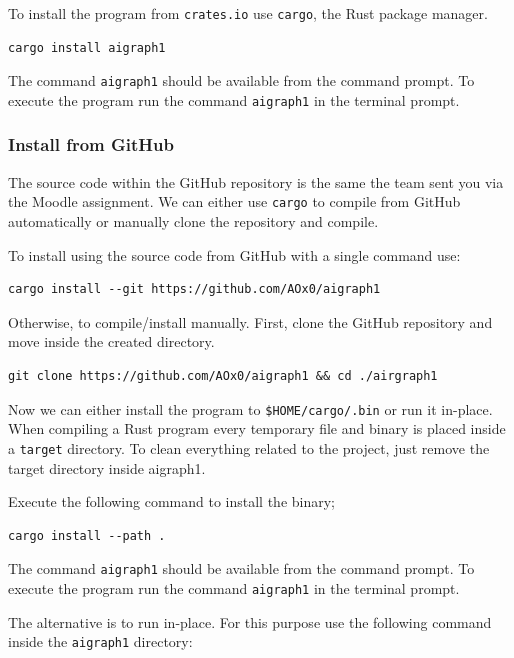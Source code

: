 To install the program from \texttt{crates.io} use \texttt{cargo}, the Rust package manager.

\begin{verbatim}
cargo install aigraph1
\end{verbatim}

The command \texttt{aigraph1} should be available from the command prompt.
To execute the program run the command \texttt{aigraph1} in the terminal prompt.

\subsubsection{Install from GitHub}

The source code within the GitHub repository is the same the team sent you via the Moodle assignment.
We can either use \texttt{cargo} to compile from GitHub automatically or manually clone the repository and
compile.

To install using the source code from GitHub with a single command use:
\begin{verbatim}
cargo install --git https://github.com/AOx0/aigraph1
\end{verbatim}

Otherwise, to compile/install manually. First, clone the GitHub repository and move inside the created directory.

\begin{verbatim}
git clone https://github.com/AOx0/aigraph1 && cd ./airgraph1
\end{verbatim}

Now we can either install the program to \texttt{\$HOME/cargo/.bin} or run it in-place. When compiling a 
Rust program every temporary file and binary is placed inside a \texttt{target} directory. To clean everything
related to the project, just remove the target directory inside aigraph1.

Execute the following command to install the binary;

\begin{verbatim}
cargo install --path .
\end{verbatim}

The command \texttt{aigraph1} should be available from the command prompt.
To execute the program run the command \texttt{aigraph1} in the terminal prompt.

The alternative is to run in-place. For this purpose use the following command inside the \texttt{aigraph1} directory:

